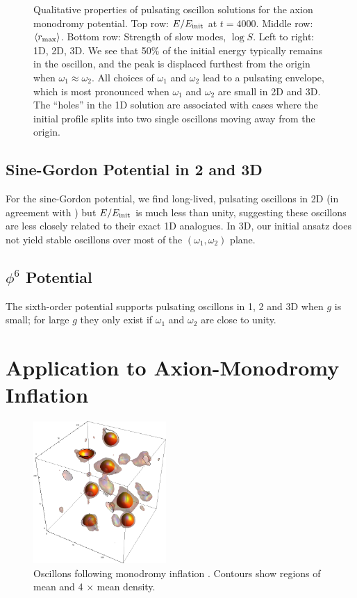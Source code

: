 \documentclass{report}
\begin{document}
\begin{figure}[p]
\begin{adjustwidth}{-1in}{-1in}
    \caption{Qualitative properties of pulsating oscillon solutions for the axion monodromy potential. Top row: $E/E_{\rm init}$ at $t=4000$.
      Middle row: $\langle r_{\rm max}\rangle$.
      Bottom row: Strength of slow modes, $\log{S}$.\quad
      Left to right: 1D, 2D, 3D. We see that 50\% of the initial energy typically remains in the oscillon, and the peak is displaced furthest from the origin when $\omega_1 \approx \omega_2$. All choices of  $\omega_1$ and $\omega_2$ lead to a pulsating envelope, which is most pronounced when $\omega_1$ and $\omega_2$ are small in 2D and 3D. The ``holes'' in the 1D solution are associated with cases where the initial profile splits into two single oscillons moving away from the origin.}\label{axion-monodromy}
  \end{adjustwidth}
\end{figure}
 
\section{Sine-Gordon Potential in 2 and 3D}

For the sine-Gordon potential, we find long-lived, pulsating oscillons in 2D (in agreement with  \cite{Hindmarsh:2006ur}) but $E/E_{\rm init}$ is much less than unity, suggesting these oscillons are  less closely related to their exact 1D analogues. In 3D, our initial ansatz does not yield stable oscillons over most of the $(\omega_1,\omega_2)$ plane.

\section{$\phi^6$ Potential}
The sixth-order potential  supports pulsating oscillons  in 1, 2 and 3D when $g$ is small; for large $g$ they only exist if  $\omega_1$ and $\omega_2$ are close to unity. 

\chapter{Application to Axion-Monodromy Inflation}
\begin{figure}
  \centering
  \includegraphics[width=0.45\textwidth]{plot/3dRE.png}
  \caption{Oscillons following monodromy inflation  \cite{Easther:2010qz}. Contours show regions of mean and 4 $\times$ mean density. }\label{oscillons}
\end{figure}
\end{document}
